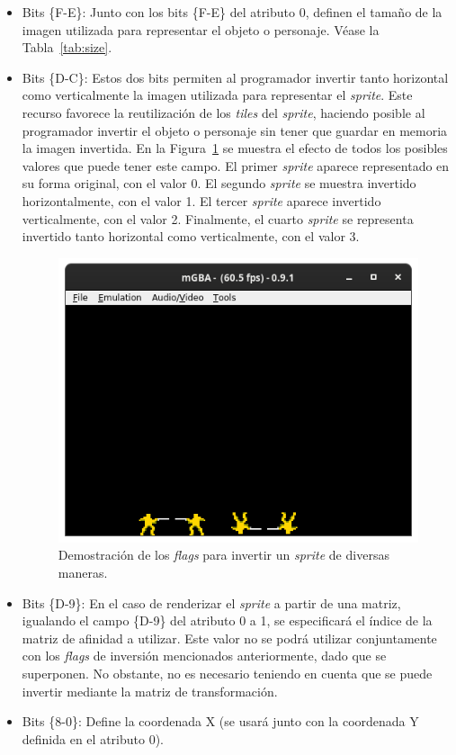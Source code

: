 \begin{itemize}
	\item Bits \{F-E\}: Junto con los bits \{F-E\} del atributo 0, definen el tamaño de la imagen utilizada para representar el objeto o personaje. Véase la Tabla~\ref{tab:size}.
	\item Bits \{D-C\}: Estos dos bits permiten al programador invertir tanto horizontal como verticalmente la imagen utilizada para representar el \textit{sprite}. Este recurso favorece la reutilización de los \textit{tiles} del \textit{sprite}, haciendo posible al programador invertir el objeto o personaje sin tener que guardar en memoria la imagen invertida.
		En la Figura~\ref{fig:invert_sprite} se muestra el efecto de todos los posibles valores que puede tener este campo. El primer \textit{sprite} aparece representado en su forma original, con el valor 0. El segundo \textit{sprite} se muestra invertido horizontalmente, con el valor 1. El tercer \textit{sprite} aparece invertido verticalmente, con el valor 2. Finalmente, el cuarto \textit{sprite} se representa invertido tanto horizontal como verticalmente, con el valor 3.

		\begin{figure}[h]
			\centering
			\includegraphics[width=.5\textwidth]{capitulos/capitulo3/invert_sprite.png}
			\caption{Demostración de los \textit{flags} para invertir un \textit{sprite} de diversas maneras.}
			\label{fig:invert_sprite}
		\end{figure}
		\FloatBarrier

	\item Bits \{D-9\}: En el caso de renderizar el \textit{sprite} a partir de una matriz, igualando el campo \{D-9\} del atributo 0 a 1, se especificará el índice de la matriz de afinidad a utilizar. Este valor no se podrá utilizar conjuntamente con los \textit{flags} de inversión mencionados anteriormente, dado que se superponen. No obstante, no es necesario teniendo en cuenta que se puede invertir mediante la matriz de transformación.
	\item Bits \{8-0\}: Define la coordenada X (se usará junto con la coordenada Y definida en el atributo 0).
\end{itemize}

